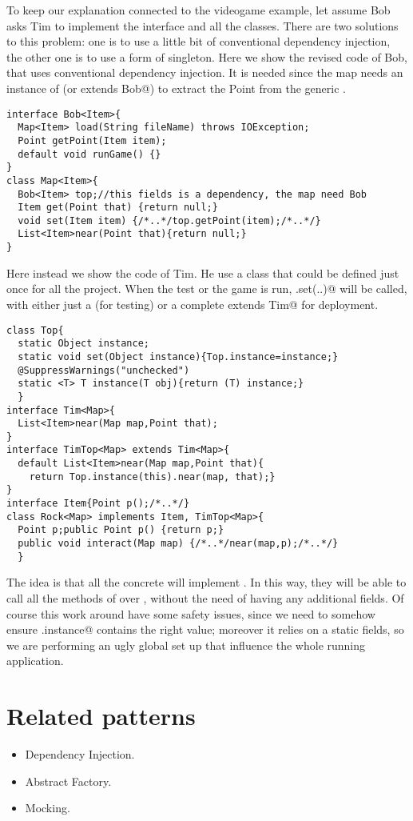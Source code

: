 \documentclass[submission,copyright,creativecommons]{eptcs}
\begin{document}
To keep our explanation connected to the videogame example, let assume
Bob asks Tim to implement the \Q@Item@ interface and all the \Q@Item@s
classes.
There are two solutions to this problem: one is
to use a little bit of conventional dependency injection,
the other one is to use a form of singleton.
Here we show the revised code of Bob, that uses conventional dependency injection.
It is needed since the map needs an instance of \Q@Bob@ (or \Q@Game extends Bob@)
to extract the Point from the generic \Q@Item@.
\begin{lstlisting}
interface Bob<Item>{
  Map<Item> load(String fileName) throws IOException;
  Point getPoint(Item item);
  default void runGame() {}
}
class Map<Item>{
  Bob<Item> top;//this fields is a dependency, the map need Bob
  Item get(Point that) {return null;}
  void set(Item item) {/*..*/top.getPoint(item);/*..*/}
  List<Item>near(Point that){return null;}
}
\end{lstlisting}
Here instead we show the code of Tim.
He use a class \Q@Top@ that could be defined 
just once for all the project.
When the test or the game is run, \Q@Top.set(..)@ will be called, with either
just a \Q@Tim@ (for testing) or a complete \Q@Game extends Tim@ for
deployment.
\begin{lstlisting}
class Top{
  static Object instance;
  static void set(Object instance){Top.instance=instance;}
  @SuppressWarnings("unchecked")
  static <T> T instance(T obj){return (T) instance;}
  }
interface Tim<Map>{
  List<Item>near(Map map,Point that);
}
interface TimTop<Map> extends Tim<Map>{
  default List<Item>near(Map map,Point that){
    return Top.instance(this).near(map, that);}
}
interface Item{Point p();/*..*/}
class Rock<Map> implements Item, TimTop<Map>{
  Point p;public Point p() {return p;}
  public void interact(Map map) {/*..*/near(map,p);/*..*/}
  }
\end{lstlisting}
The idea is that all the concrete \Q@Item@s will implement \Q@TimTop@.
In this way, they will be able to call all the methods of \Q@Tim@ over \Q@this@,
without the need of having any additional fields.
Of course this work around have some safety issues, since we need to somehow ensure
\Q@Top.instance@ contains the right value;
moreover it relies on a static fields, so we are performing an ugly
global set up that influence the whole running application.

\section{Related patterns}
\begin{itemize}
\item Dependency Injection.
\item Abstract Factory.
\item Mocking.
\end{itemize}
\end{document}
